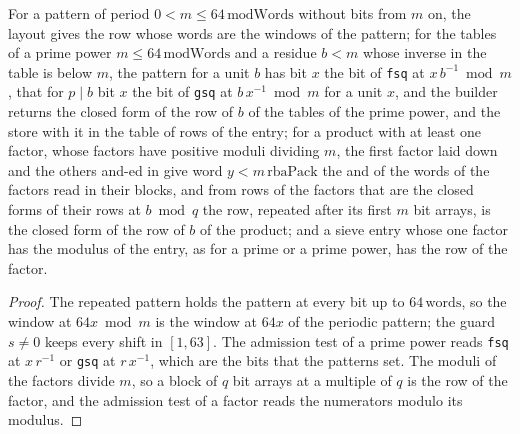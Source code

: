 \begin{lemma}\label{lem:compositeRows}
  \leanok
  For a pattern of period $0 < m \le 64\,\mathrm{modWords}$ without bits from $m$ on, the layout
  gives the row whose words are the windows of the pattern; for the tables of a prime power
  $m \le 64\,\mathrm{modWords}$ and a residue $b < m$ whose inverse in the table is below $m$, the
  pattern for a unit $b$ has bit $x$ the bit of \verb|fsq| at $x\, b^{-1} \bmod m$, that for
  $p \mid b$ bit $x$ the bit of \verb|gsq| at $b\, x^{-1} \bmod m$ for a unit $x$, and the builder
  returns the closed form of the row of $b$ of the tables of the prime power, and the store with it
  in the table of rows of the entry; for a product with at least one factor, whose factors have
  positive moduli dividing $m$, the first factor laid down and the others and-ed in give word
  $y < m\,\mathrm{rbaPack}$ the and of the words of the factors read in their blocks, and from rows
  of the factors that are the closed forms of their rows at $b \bmod q$ the row, repeated after its
  first $m$ bit arrays, is the closed form of the row of $b$ of the product; and a sieve entry
  whose one factor has the modulus of the entry, as for a prime or a prime power, has the row of
  the factor.
\end{lemma}

\begin{proof}
  \leanok
  The repeated pattern holds the pattern at every bit up to $64\,\mathrm{words}$, so the window at
  $64 x \bmod m$ is the window at $64 x$ of the periodic pattern; the guard $s \ne 0$ keeps every
  shift in $[1, 63]$. The admission test of a prime power reads \verb|fsq| at $x\, r^{-1}$ or
  \verb|gsq| at $r\, x^{-1}$, which are the bits that the patterns set. The moduli of the factors
  divide $m$, so a block of $q$ bit arrays at a multiple of $q$ is the row of the factor, and the
  admission test of a factor reads the numerators modulo its modulus.
\end{proof}

